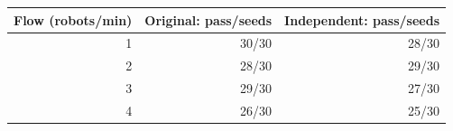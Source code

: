 \begin{tabular}{rrr}
\toprule
Flow (robots/min) & Original: pass/seeds & Independent: pass/seeds \\
\midrule
1 & 30/30 & 28/30 \\
2 & 28/30 & 29/30 \\
3 & 29/30 & 27/30 \\
4 & 26/30 & 25/30 \\
\bottomrule
\end{tabular}
